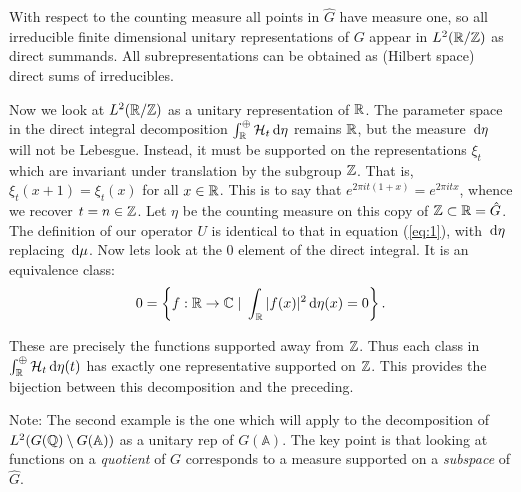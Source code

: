 \documentclass[11pt]{amsart}
\newcommand{\hsp}{\hspace{1mm}}
\renewcommand{\H}{\mathcal{H}}
\newcommand{\set}[2]{\left\{ #1 \hsp| \hsp #2\right\}}
\begin{document}
\par With respect to the counting measure all points in $\hat{G}$ have measure one, so all irreducible finite dimensional unitary representations of $G$ appear in $L^{2}(\mathbb{R}/\mathbb{Z})$ as direct summands. All subrepresentations can be obtained as (Hilbert space) direct sums of irreducibles. 

\par Now we look at $L^{2}(\mathbb{R}/\mathbb{Z})$ as a unitary representation of $\mathbb{R}$. The parameter space in the direct integral decomposition $\int_{\R}^{\oplus}\H_{t}\dop \eta$ remains $\mathbb{R}$, but the measure $\,{\rm d} \eta$ will not be Lebesgue. Instead, it must be supported on the representations $\xi_{t}$ which are invariant under translation by the subgroup $\mathbb{Z}$. That is, $\xi_{t}(x+1)=\xi_{t}(x)$ for all $x\in \mathbb{R}$. This is to say that $e^{2\pi i t(1+x)}=e^{2\pi i tx}$, whence we recover $t=n\in \mathbb{Z}$. Let $\eta$ be the counting measure on this copy of $\mathbb{Z}\subset \mathbb{R} =\hat{G}$. The definition of our operator $U$ is identical to that in equation (\ref{eq:1}), with $\,{\rm d} \eta$ replacing $\,{\rm d} \mu$. Now lets look at the $0$ element of the direct integral. It is an equivalence class:
	\begin{align*}
				0=\set{f:\R \to \C}{\int_{\R}|f(x)|^{2} \dop \eta(x)=0}.
	\end{align*}

These are precisely the functions supported away from $\mathbb{Z}$. Thus each class in $\int^{\oplus}_{\R}\H_{t}\dop \eta(t)$ has exactly one representative supported on $\mathbb{Z}$. This provides the bijection between this decomposition and the preceding.

\par Note: The second example is the one which will apply to the decomposition of $L^{2}(G(\mathbb{Q})\setminus G(\mathbb{A}))$ as a unitary rep of $G(\mathbb{A})$. The key point is that looking at functions on a \emph{quotient} of $G$ corresponds to a measure supported on a \emph{subspace} of $\hat{G}$.  
\end{document}
